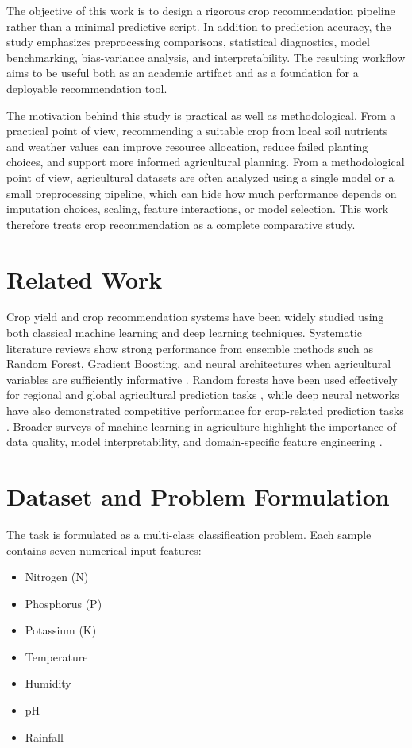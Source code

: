 \documentclass[conference]{IEEEtran}
\begin{document}
The objective of this work is to design a rigorous crop recommendation pipeline rather than a minimal predictive script. In addition to prediction accuracy, the study emphasizes preprocessing comparisons, statistical diagnostics, model benchmarking, bias-variance analysis, and interpretability. The resulting workflow aims to be useful both as an academic artifact and as a foundation for a deployable recommendation tool.

The motivation behind this study is practical as well as methodological. From a practical point of view, recommending a suitable crop from local soil nutrients and weather values can improve resource allocation, reduce failed planting choices, and support more informed agricultural planning. From a methodological point of view, agricultural datasets are often analyzed using a single model or a small preprocessing pipeline, which can hide how much performance depends on imputation choices, scaling, feature interactions, or model selection. This work therefore treats crop recommendation as a complete comparative study.

\section{Related Work}
Crop yield and crop recommendation systems have been widely studied using both classical machine learning and deep learning techniques. Systematic literature reviews show strong performance from ensemble methods such as Random Forest, Gradient Boosting, and neural architectures when agricultural variables are sufficiently informative \cite{klompenburg2020}. Random forests have been used effectively for regional and global agricultural prediction tasks \cite{jeong2016}, while deep neural networks have also demonstrated competitive performance for crop-related prediction tasks \cite{khaki2019}. Broader surveys of machine learning in agriculture highlight the importance of data quality, model interpretability, and domain-specific feature engineering \cite{liakos2018}.

\section{Dataset and Problem Formulation}
The task is formulated as a multi-class classification problem. Each sample contains seven numerical input features:
\begin{itemize}
    \item Nitrogen (N)
    \item Phosphorus (P)
    \item Potassium (K)
    \item Temperature
    \item Humidity
    \item pH
    \item Rainfall
\end{itemize}
\end{document}
